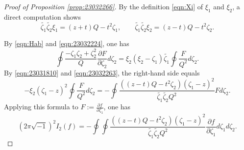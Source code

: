 \documentclass[12pt,leqno]{amsart}
\theoremstyle{plain}
\theoremstyle{definition}
\begin{document}
\begin{proof}
[Proof of Proposition \ref{prop:23032266}]
By the definition \eqref{eqn:Xi} of $\xi_1$ and $\xi_2$, 
 a direct computation shows
\begin{equation}
   \widetilde{\zeta_1} \widetilde{\zeta_2} \xi_1 = (z+t) Q -t^2 \zeta_1, 
\qquad
   \widetilde{\zeta_1} \widetilde{\zeta_2} \xi_2 = (z-t) Q -t^2 \zeta_2.  
\label{eqn:23032263}
\end{equation}

By \eqref{eqn:Hab} and \eqref{eqn:23032224}, 
 one has
\[
   \oint \frac{-\zeta_1 \zeta_2+ \zeta_2^2}{Q} 
         \frac{\partial F}{\partial \zeta_2} d \zeta_2
   =
   \xi_2 (\xi_2-\zeta_1)\widetilde{\zeta_1} 
   \oint \frac{F}{Q^2} d \zeta_2.  
\]
By \eqref{eqn:23031810} and \eqref{eqn:23032263}, 
 the right-hand side equals
\[
   -\xi_2(\zeta_1-z)^2 \oint \frac F{Q^2} d \zeta_2
  =-\oint 
    \frac{((z-t)Q-t^2\zeta_2) (\zeta_1-z)^2}{\widetilde{\zeta_1}\widetilde{\zeta_2} Q^2} 
 F d \zeta_2.  
\]
Applying this formula to $F:=\frac{\partial f}{\partial \zeta_1}$, 
 one has 
\begin{equation}
\label{eqn:zeta12Q}
   (2 \pi \sqrt{-1})^2 I_2(f)
  = - \oint \oint
    \frac{((z-t)Q-t^2\zeta_2) (\zeta_1-z)^2}{\widetilde{\zeta_1}\widetilde{\zeta_2} Q^2} 
   \frac{\partial f}{\partial \zeta_1}
   d \zeta_1 d \zeta_2.  
\end{equation}




\end{proof}
\end{document}
